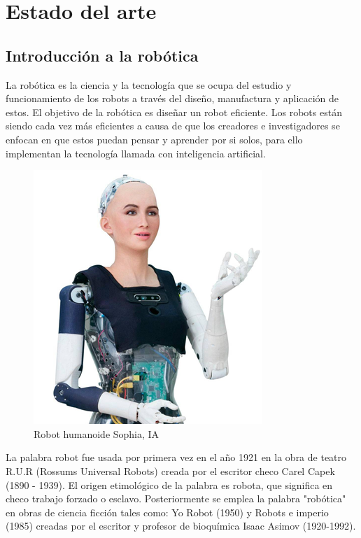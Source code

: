 \chapter{Estado del arte}\label{CAP2}


\section{Introducción a la robótica}
    La robótica es la ciencia y la tecnología que se ocupa del estudio y funcionamiento de los robots a través del diseño, manufactura y aplicación de estos. El objetivo de la robótica es diseñar un robot eficiente. Los robots están siendo cada vez más eficientes a causa de que los creadores e investigadores se enfocan en que estos puedan pensar y aprender por si solos, para ello implementan la tecnología llamada con inteligencia artificial.
    
    \begin{figure}[htb]
        \centering
        \includegraphics[width=0.4\linewidth]{Main/Chapter2/Images2/Robot-humanoideSophiaIA.png}
        \caption{Robot humanoide Sophia, IA}
        \label{f:Cap2_general_1}
    \end{figure}   
    
    La palabra robot fue usada por primera vez en el año 1921 en la obra de teatro R.U.R (Rossums Universal Robots) creada por el escritor checo Carel Capek (1890 - 1939). El origen etimológico de la palabra es robota, que significa en checo trabajo forzado o esclavo. Posteriormente se emplea la palabra "robótica" en obras de ciencia ficción tales como: Yo Robot (1950) y Robots e imperio (1985) creadas por el escritor y profesor de bioquímica Isaac Asimov (1920-1992).
    
    \newpage
    
